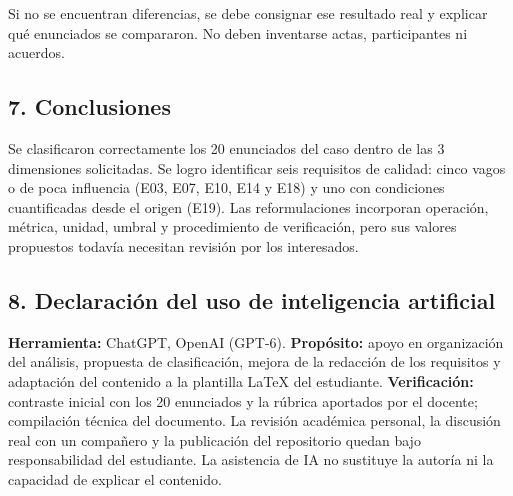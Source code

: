 \documentclass[12pt,a4paper]{article}
\begin{document}
Si no se encuentran diferencias, se debe consignar ese resultado real y explicar qué enunciados se compararon. No deben inventarse actas, participantes ni acuerdos.


\subsection*{7. Conclusiones}

Se clasificaron correctamente los 20 enunciados del caso dentro de las 3 dimensiones solicitadas. Se logro identificar seis requisitos de calidad: cinco vagos o de poca influencia (E03, E07, E10, E14 y E18) y uno con condiciones cuantificadas desde el origen (E19). Las reformulaciones incorporan operación, métrica, unidad, umbral y procedimiento de verificación, pero sus valores propuestos todavía necesitan revisión por los interesados.

\subsection*{8. Declaración del uso de inteligencia artificial}

\textbf{Herramienta:} ChatGPT, OpenAI (GPT-6).
\textbf{Propósito:} apoyo en organización del análisis, propuesta de clasificación, mejora de la redacción de los requisitos y adaptación del contenido a la plantilla LaTeX del estudiante.
\textbf{Verificación:} contraste inicial con los 20 enunciados y la rúbrica aportados por el docente; compilación técnica del documento. La revisión académica personal, la discusión real con un compañero y la publicación del repositorio quedan bajo responsabilidad del estudiante. La asistencia de IA no sustituye la autoría ni la capacidad de explicar el contenido.

\end{document}

